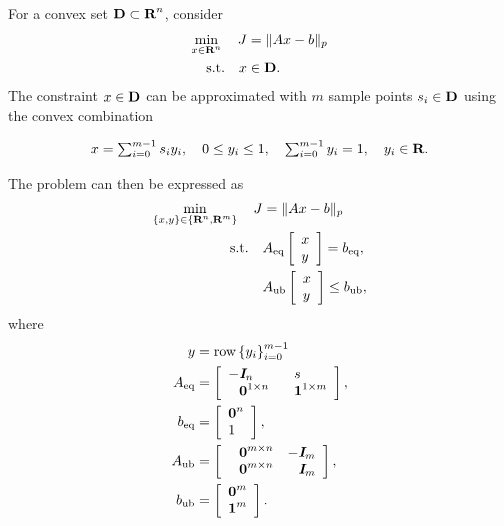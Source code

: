 \documentclass{article}
\begin{document}
    For a convex set $\textbf{D}\subset\textbf{R}^n$, consider
    \begin{align*}
        \min_{x\in\textbf{R}^n}\quad J &= \|Ax-b\|_p\\
        \text{s.t.} \quad x&\in\textbf{D}.
    \end{align*}
    The constraint $x\in \textbf{D}$ can be approximated with $m$ sample points $s_i\in \textbf{D}$ 
    using the convex combination \cite[p.~24]{bv_cvxbook}

    \begin{align*}
            x = \textstyle\sum_{i=0}^{m-1} s_iy_i,
        \quad
            0 \leq y_i \leq 1,
        \quad
        \textstyle\sum_{i=0}^{m-1}y_i=1,
        \quad
            y_i\in\textbf{R}. 
    \end{align*}

    The problem can then be expressed as
    \begin{align*}
        \min_{\{x,y\}\in\{\textbf{R}^n,\textbf{R}^{m}\}}\quad J &= \|Ax-b\|_p\\
        \text{s.t.} \quad 
        &A_{\text{eq}} \left[\begin{array}{l}
            x\\
            y
        \end{array}\right] = b_{\text{eq}},\\
        &A_{\text{ub}} \left[\begin{array}{l}
            x\\
            y
        \end{array}\right] \leq b_{\text{ub}},
    \end{align*}
    where
    \begin{align*}
        y &= \row\left\{y_i\right\}_{i=0}^{m-1}\\
        A_\eq & =
        \left[
            \begin{array}{llll}
                    -\eye_n 
                &
                    \minus s
                \\
                    \minus \zeros^{1\times n}
                &
                    \minus \ones^{1\times m}
            \end{array}
        \right],\\
        b_\eq & =
        \left[
            \begin{array}{l}
                    \zeros^n\\
                    1
            \end{array}
        \right],\\
        A_\ub & =
        \left[
            \begin{array}{llll}
                    \minus \zeros^{m\times n} 
                &
                    -\eye_{m}
                \\
                    \minus \zeros^{m\times n} 
                &
                    \minus \eye_{m}
            \end{array}
        \right],\\
        b_\ub & =
        \left[
            \begin{array}{l}
                    \zeros^{m}\\
                    \ones^{m}
            \end{array}
        \right].
    \end{align*}
\end{document}
